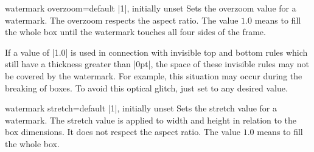 \begin{docTcbKey}[][doc updated=2022-07-21]{watermark overzoom}{=}{default |1|, initially unset}
  Sets the overzoom value for a watermark. The overzoom respects the aspect ratio.
  The value $1.0$ means to fill the whole box until the watermark touches
  all four sides of the frame.
\begin{dispExample}

\begin{tcolorbox}[title=Zoom 1.0,watermark zoom=1.0]
\lipsum[1]
\end{tcolorbox}\hfill%
\begin{tcolorbox}[title=Overzoom 1.0,watermark overzoom=1.0]
\lipsum[1]
\end{tcolorbox}%
\end{dispExample}
\end{docTcbKey}

\begin{marker}
If a  value of |1.0| is used in connection
with invisible top and bottom rules which still have a thickness greater than |0pt|,
the space of these invisible rules may not be covered by the watermark.
For example, this situation may occur during the breaking of  boxes.
To avoid this optical glitch, just set  to any desired value.
\end{marker}

\clearpage
\begin{docTcbKey}[][doc updated=2022-07-21]{watermark stretch}{=}{default |1|, initially unset}
  Sets the stretch value for a watermark. The stretch value is applied to width
  and height in relation to the box dimensions. It does not respect the aspect ratio.
  The value $1.0$ means to fill the whole box.
\begin{dispExample}

\begin{tcolorbox}[title=Stretch 1.00,watermark stretch=1.00]
\lipsum[2]
\end{tcolorbox}\hfill%
\begin{tcolorbox}[title=Stretch 0.50,watermark stretch=0.50]
\lipsum[2]
\end{tcolorbox}%
\end{dispExample}
\end{docTcbKey}

